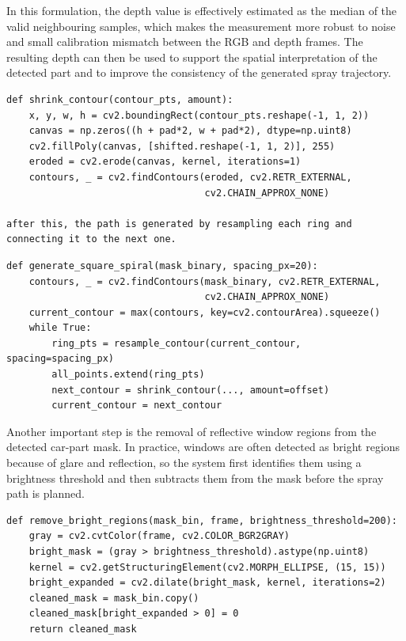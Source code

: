 In this formulation, the depth value is effectively estimated as the median of the valid neighbouring samples, which makes the measurement more robust to noise and small calibration mismatch between the RGB and depth frames. The resulting depth can then be used to support the spatial interpretation of the detected part and to improve the consistency of the generated spray trajectory.

\begin{verbatim}
def shrink_contour(contour_pts, amount):
    x, y, w, h = cv2.boundingRect(contour_pts.reshape(-1, 1, 2))
    canvas = np.zeros((h + pad*2, w + pad*2), dtype=np.uint8)
    cv2.fillPoly(canvas, [shifted.reshape(-1, 1, 2)], 255)
    eroded = cv2.erode(canvas, kernel, iterations=1)
    contours, _ = cv2.findContours(eroded, cv2.RETR_EXTERNAL,
                                   cv2.CHAIN_APPROX_NONE)

after this, the path is generated by resampling each ring and connecting it to the next one.
\end{verbatim}

\begin{verbatim}
def generate_square_spiral(mask_binary, spacing_px=20):
    contours, _ = cv2.findContours(mask_binary, cv2.RETR_EXTERNAL,
                                   cv2.CHAIN_APPROX_NONE)
    current_contour = max(contours, key=cv2.contourArea).squeeze()
    while True:
        ring_pts = resample_contour(current_contour, spacing=spacing_px)
        all_points.extend(ring_pts)
        next_contour = shrink_contour(..., amount=offset)
        current_contour = next_contour
\end{verbatim}

Another important step is the removal of reflective window regions from the detected car-part mask. In practice, windows are often detected as bright regions because of glare and reflection, so the system first identifies them using a brightness threshold and then subtracts them from the mask before the spray path is planned.

\begin{verbatim}
def remove_bright_regions(mask_bin, frame, brightness_threshold=200):
    gray = cv2.cvtColor(frame, cv2.COLOR_BGR2GRAY)
    bright_mask = (gray > brightness_threshold).astype(np.uint8)
    kernel = cv2.getStructuringElement(cv2.MORPH_ELLIPSE, (15, 15))
    bright_expanded = cv2.dilate(bright_mask, kernel, iterations=2)
    cleaned_mask = mask_bin.copy()
    cleaned_mask[bright_expanded > 0] = 0
    return cleaned_mask
\end{verbatim}

